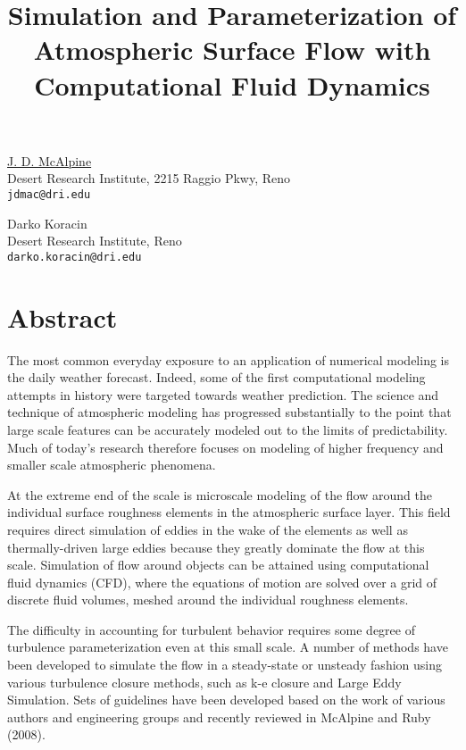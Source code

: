 \title{Simulation and Parameterization of Atmospheric Surface Flow with Computational Fluid Dynamics}
\author{} \institute{}
\maketitle

\begin{center}
{\large \underline{J. D. McAlpine}}\\
Desert Research Institute, 2215 Raggio Pkwy, Reno\\
{\tt jdmac@dri.edu}\\
\vspace{4mm}

{\large Darko Koracin}\\
Desert Research Institute, Reno\\
{\tt darko.koracin@dri.edu}
\end{center}

\section*{Abstract}
The most common everyday exposure to an application of numerical modeling is the daily weather forecast. Indeed, some of the first computational modeling attempts in history were targeted towards weather prediction. The science and technique of atmospheric modeling has progressed substantially to the point that large scale features can be accurately modeled out to the limits of predictability. Much of today\textquoteright s research therefore focuses on modeling of higher frequency and smaller scale atmospheric phenomena.

At the extreme end of the scale is microscale modeling of the flow around the individual surface roughness elements in the atmospheric surface layer. This field requires direct simulation of eddies in the wake of the elements as well as thermally-driven large eddies because they greatly dominate the flow at this scale. Simulation of flow around objects can be attained using computational fluid dynamics (CFD), where the equations of motion are solved over a grid of discrete  fluid volumes, meshed around the individual roughness elements.

The difficulty in accounting for turbulent behavior requires some degree of turbulence parameterization even at this small scale. A number of methods have been developed to simulate the flow in a steady-state or unsteady fashion using various turbulence closure methods, such as k-e closure and Large Eddy Simulation. Sets of guidelines have been developed based on the work of various authors and engineering groups and recently reviewed in McAlpine and Ruby (2008).

